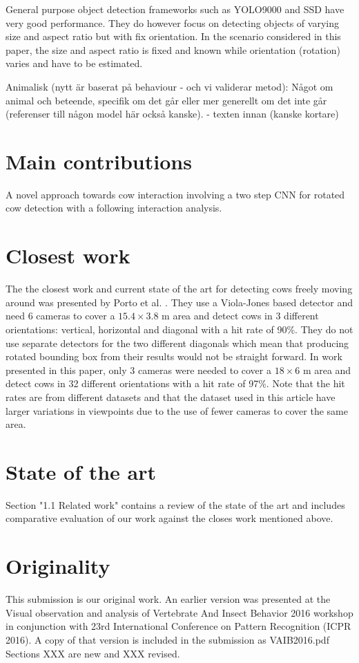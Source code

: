 \documentclass[10pt,a4paper]{article}
\begin{document}
General purpose object detection frameworks such as YOLO9000 \cite{FIXME} and SSD \cite{FXIME} have very good performance.
 They do however focus on detecting objects of varying size and aspect ratio but with fix orientation. 
 In the scenario considered in this paper, 
 the size and aspect ratio is fixed and known while orientation (rotation) 
 varies and have to be estimated.

Animalisk (nytt är baserat på behaviour - och vi validerar metod):
Något om animal och beteende, specifik om det går eller mer generellt om det inte går (referenser till någon model här också kanske).
- texten innan (kanske kortare)


\section{Main contributions}
A novel approach towards cow interaction involving a two step CNN for rotated cow detection with a following interaction analysis.

\section{Closest work}
The the closest work and current state of the art for detecting cows freely moving around was presented by Porto et al. \cite{porto2015automatic}. They use a Viola-Jones based detector and need 
6 cameras to cover a $15.4 \times 3.8$ m area and detect cows in 3 different orientations: vertical, horizontal and diagonal with a hit rate of 90\%. They do not use separate detectors for the two different diagonals which mean that producing rotated bounding box from their results would not be straight forward. In work presented in this paper, only 3 cameras were needed to cover a $18 \times 6$ m area and detect cows in 32 different orientations with a hit rate of 97\%. Note that the hit rates are from different datasets and that the dataset used in this article have larger variations in viewpoints due to the use of fewer cameras to cover the same area.

\section{State of the art}
Section "1.1 Related work" contains a review of the state of the art and includes comparative evaluation of our work against the closes work mentioned above.

\section{Originality}
This submission is our original work. An earlier version was presented at the Visual observation and analysis of Vertebrate And Insect Behavior 2016 workshop  in conjunction with 23rd International Conference on Pattern Recognition (ICPR 2016). A copy of that version is included in the submission as VAIB2016.pdf Sections XXX are new and XXX revised.


{\parindent0pt
\parskip8pt

}
\end{document}

